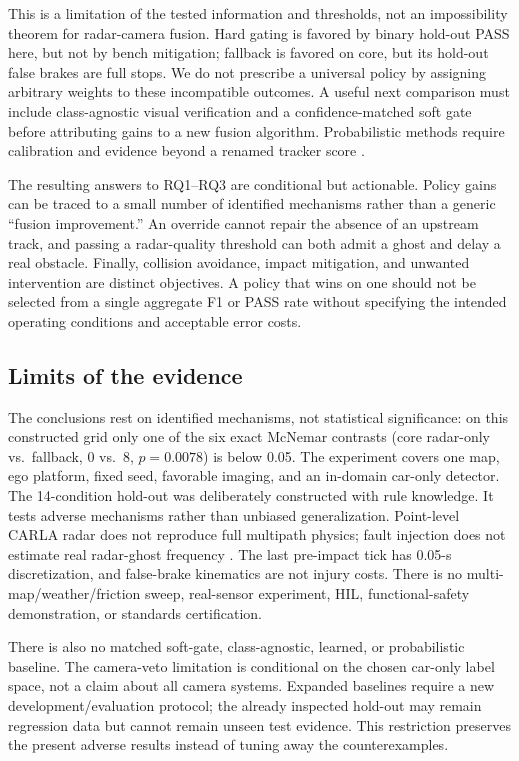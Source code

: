\documentclass[conference]{IEEEtran}
\begin{document}
This is a limitation of the tested information and thresholds, not an
impossibility theorem for radar-camera fusion. Hard gating is favored by binary
hold-out PASS here, but not by bench mitigation; fallback is favored on core,
but its hold-out false brakes are full stops. We do not prescribe a universal
policy by assigning arbitrary weights to these incompatible outcomes. A useful
next comparison must include class-agnostic visual verification and a
confidence-matched soft gate before attributing gains to a new fusion algorithm.
Probabilistic methods require calibration and evidence beyond a renamed tracker
score \cite{sandblom2011threat,lindenmaier2022existence}.

The resulting answers to RQ1--RQ3 are conditional but actionable. Policy gains
can be traced to a small number of identified mechanisms rather than a generic
``fusion improvement.'' An override cannot repair the absence of an upstream
track, and passing a radar-quality threshold can both admit a ghost and delay a
real obstacle. Finally, collision avoidance, impact mitigation, and unwanted
intervention are distinct objectives. A policy that wins on one should not be
selected from a single aggregate F1 or PASS rate without specifying the intended
operating conditions and acceptable error costs.

\subsection{Limits of the evidence}\label{sec:limits}
The conclusions rest on identified mechanisms, not statistical significance:
on this constructed grid only one of the six exact McNemar contrasts (core
radar-only vs.\ fallback, 0 vs.\ 8, $p=0.0078$) is below 0.05.
The experiment covers one map, ego platform, fixed seed, favorable imaging,
and an in-domain car-only detector. The 14-condition
hold-out was deliberately constructed with rule knowledge. It tests adverse
mechanisms rather than unbiased generalization. Point-level CARLA radar does
not reproduce full multipath physics; fault injection does not estimate real
radar-ghost frequency \cite{kraus2021ghost,magosi2022radar}. The last pre-impact
tick has 0.05-s discretization, and false-brake kinematics are not injury costs.
There is no multi-map/weather/friction sweep, real-sensor experiment, HIL,
functional-safety demonstration, or standards certification.

There is also no matched soft-gate, class-agnostic, learned, or probabilistic
baseline. The camera-veto limitation is conditional on the chosen car-only
label space, not a claim about all camera systems. Expanded baselines require a
new development/evaluation protocol; the already inspected hold-out may remain
regression data but cannot remain unseen test evidence. This restriction
preserves the present adverse results instead of tuning away the counterexamples.
\end{document}

